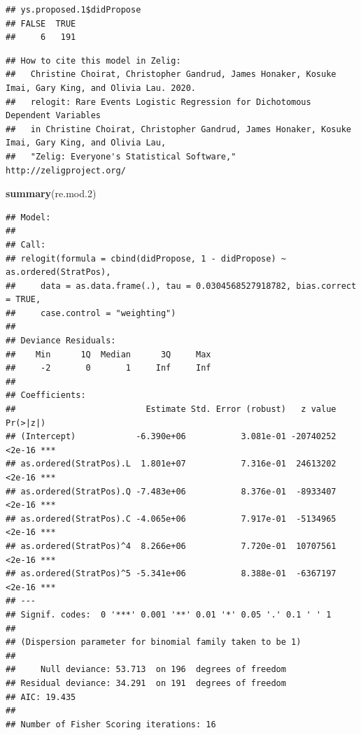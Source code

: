 \documentclass[
]{article}
\newenvironment{Shaded}{\begin{snugshade}}{\end{snugshade}}
\newcommand{\DataTypeTok}[1]{\textcolor[rgb]{0.13,0.29,0.53}{#1}}
\newcommand{\DecValTok}[1]{\textcolor[rgb]{0.00,0.00,0.81}{#1}}
\newcommand{\FloatTok}[1]{\textcolor[rgb]{0.00,0.00,0.81}{#1}}
\newcommand{\KeywordTok}[1]{\textcolor[rgb]{0.13,0.29,0.53}{\textbf{#1}}}
\newcommand{\NormalTok}[1]{#1}
\newcommand{\OperatorTok}[1]{\textcolor[rgb]{0.81,0.36,0.00}{\textbf{#1}}}
\newcommand{\OtherTok}[1]{\textcolor[rgb]{0.56,0.35,0.01}{#1}}
\newcommand{\StringTok}[1]{\textcolor[rgb]{0.31,0.60,0.02}{#1}}
\begin{document}
\begin{verbatim}
## ys.proposed.1$didPropose
## FALSE  TRUE 
##     6   191
\end{verbatim}

\begin{Shaded}
\end{Shaded}

\begin{verbatim}
## How to cite this model in Zelig:
##   Christine Choirat, Christopher Gandrud, James Honaker, Kosuke Imai, Gary King, and Olivia Lau. 2020.
##   relogit: Rare Events Logistic Regression for Dichotomous Dependent Variables
##   in Christine Choirat, Christopher Gandrud, James Honaker, Kosuke Imai, Gary King, and Olivia Lau,
##   "Zelig: Everyone's Statistical Software," http://zeligproject.org/
\end{verbatim}

\begin{Shaded}
\begin{Highlighting}[]
\KeywordTok{summary}\NormalTok{(re.mod}\FloatTok{.2}\NormalTok{)}
\end{Highlighting}
\end{Shaded}

\begin{verbatim}
## Model: 
## 
## Call:
## relogit(formula = cbind(didPropose, 1 - didPropose) ~ as.ordered(StratPos), 
##     data = as.data.frame(.), tau = 0.0304568527918782, bias.correct = TRUE, 
##     case.control = "weighting")
## 
## Deviance Residuals: 
##    Min      1Q  Median      3Q     Max  
##     -2       0       1     Inf     Inf  
## 
## Coefficients:
##                          Estimate Std. Error (robust)   z value Pr(>|z|)    
## (Intercept)            -6.390e+06           3.081e-01 -20740252   <2e-16 ***
## as.ordered(StratPos).L  1.801e+07           7.316e-01  24613202   <2e-16 ***
## as.ordered(StratPos).Q -7.483e+06           8.376e-01  -8933407   <2e-16 ***
## as.ordered(StratPos).C -4.065e+06           7.917e-01  -5134965   <2e-16 ***
## as.ordered(StratPos)^4  8.266e+06           7.720e-01  10707561   <2e-16 ***
## as.ordered(StratPos)^5 -5.341e+06           8.388e-01  -6367197   <2e-16 ***
## ---
## Signif. codes:  0 '***' 0.001 '**' 0.01 '*' 0.05 '.' 0.1 ' ' 1
## 
## (Dispersion parameter for binomial family taken to be 1)
## 
##     Null deviance: 53.713  on 196  degrees of freedom
## Residual deviance: 34.291  on 191  degrees of freedom
## AIC: 19.435
## 
## Number of Fisher Scoring iterations: 16
\end{verbatim}
\end{document}
